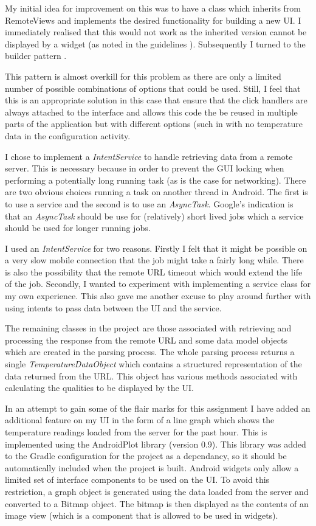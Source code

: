 \documentclass[paper=a4, fontsize=11pt]{scrartcl}	%
\numberwithin{equation}{section}															%
\numberwithin{figure}{section}																%
\numberwithin{table}{section}
\begin{document}
 My initial idea for improvement on this was to have a class which inherits from RemoteViews and implements the desired functionality for building a new UI. I immediately realised that this would not work as the inherited version cannot be displayed by a widget (as noted in the guidelines \cite{android-widget-guidelines}). Subsequently I turned to the builder pattern \cite{vlissides1995design}. 
 
 This pattern is almost overkill for this problem as there are only a limited number of possible combinations of options that could be used. Still, I feel that this is an appropriate solution in this case that ensure that the click handlers are always attached to the interface and allows this code the be reused in multiple parts of the application but with different options (such in with no temperature data in the configuration activity.
 
I chose to implement a \textit{IntentService} to handle retrieving data from a remote server. This is necessary because in order to prevent the GUI locking when performing a potentially long running task (as is the case for networking). There are two obvious choices running a task on another thread in Android. The first is to use a service and the second is to use an \textit{AsyncTask}. Google's indication is that an \textit{AsyncTask} should be use for (relatively) short lived jobs which a service should be used for longer running jobs. 

I used an \textit{IntentService} for two reasons. Firstly I felt that it might be possible on a very slow mobile connection that the job might take a fairly long while. There is also the possibility that the remote URL timeout which would extend the life of the job. Secondly, I wanted to experiment with implementing a service class for my own experience. This also gave me another excuse to play around further with using intents to pass data between the UI and the service.

The remaining classes in the project are those associated with retrieving and processing the response from the remote URL and some data model objects which are created in the parsing process. The whole parsing process returns a single \textit{TemperatureDataObject} which contains a structured representation of the data returned from the URL. This object has various methods associated with calculating the qualities to be displayed by the UI. 

In an attempt to gain some of the flair marks for this assignment I have added an additional feature on my UI in the form of a line graph which shows the temperature readings loaded from the server for the past hour. This is implemented using the AndroidPlot library \cite{android-plot} (version 0.9). This library was added to the Gradle configuration for the project as a dependancy, so it should be automatically included when the project is built. Android widgets only allow a limited set of interface components to be used on the UI. To avoid this restriction, a graph object is generated using the data loaded from the server and converted to a Bitmap object. The bitmap is then displayed as the contents of an image view (which is a component that is allowed to be used in widgets). 
\end{document}
